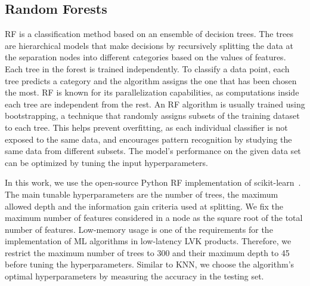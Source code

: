 \subsection*{Random Forests}

\ac{RF} is a classification method based on an ensemble of decision trees. The trees are hierarchical models that make decisions by recursively splitting the data at the separation nodes into different categories based on the values of features. Each tree in the forest is trained independently. To classify a data point, each tree predicts a category and the algorithm assigns the one that has been chosen the most. \ac{RF} is known for its parallelization capabilities, as computations inside each tree are independent from the rest. An \ac{RF} algorithm is usually trained using bootstrapping, a technique that randomly assigns subsets of the training dataset to each tree. This helps prevent overfitting, as each individual classifier is not exposed to the same data, and encourages pattern recognition by studying the same data from different subsets. The model's performance on the given data set can be optimized by tuning the input hyperparameters.

In this work, we use the open-source Python \ac{RF} implementation of scikit-learn~\cite{Pedregosa:2011ork}. The main tunable hyperparameters are the number of trees, the maximum allowed depth and the information gain criteria used at splitting. We fix the maximum number of features considered in a node as the square root of the total number of features. Low-memory usage is one of the requirements for the implementation of \ac{ML} algorithms in low-latency \ac{LVK} products. Therefore, we restrict the maximum number of trees to 300 and their maximum depth to 45 before tuning the hyperparameters. Similar to \ac{KNN}, we choose the algorithm's optimal hyperparameters by measuring the accuracy in the testing set.
